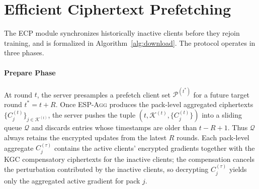 \documentclass[10pt,conference]{IEEEtran}
\begin{document}
\begin{algorithm}[t]
\caption{\textsc{ECP} Download Module}
\label{alg:download}
\small
{}



\end{algorithm}

\section{Efficient Ciphertext Prefetching}
\label{sec:ecp}

The ECP module synchronizes historically inactive clients before they rejoin training, and is formalized in Algorithm~\ref{alg:download}. The protocol operates in three phases.

\paragraph{Prepare Phase}
At round $t$, the server presamples a prefetch client set $\mathcal{P}^{(t^*)}$ for a future target round $t^*=t+R$. Once \textsc{ESP-Agg} produces the pack-level aggregated ciphertexts $\{C_j^{(t)}\}_{j\in\mathcal{K}^{(t)}}$, the server pushes the tuple $(t,\mathcal{K}^{(t)},\{C_j^{(t)}\})$ into a sliding queue $\mathcal{Q}$ and discards entries whose timestamps are older than $t-R+1$. Thus $\mathcal{Q}$ always retains the encrypted updates from the latest $R$ rounds. Each pack-level aggregate $C_j^{(\tau)}$ contains the active clients' encrypted gradients together with the KGC compensatory ciphertexts for the inactive clients; the compensation cancels the perturbation contributed by the inactive clients, so decrypting $C_j^{(\tau)}$ yields only the aggregated active gradient for pack $j$.
\end{document}
